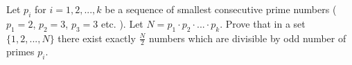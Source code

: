 Let $p_i$ for $i=1,2,..., k$ be a sequence of smallest consecutive prime numbers ($p_1=2$, $p_2=3$, $p_3=3$  etc. ). Let $N=p_1\cdot p_2 \cdot ... \cdot p_k$. Prove that in a set $\{ 1,2,...,N \}$ there exist exactly $\frac{N}{2}$ numbers which are divisible by odd number of primes $p_i$.


